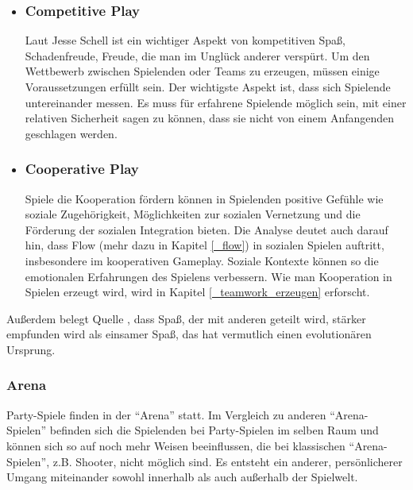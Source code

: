 \begin{itemize}
\item\subsubsection{Competitive Play}
Laut Jesse Schell ist ein wichtiger Aspekt von kompetitiven Spaß, Schadenfreude, Freude, die man im Unglück anderer verspürt\cite[S. 196]{_art_of_gamedesign}.
Um den Wettbewerb zwischen Spielenden oder Teams zu erzeugen, müssen einige Voraussetzungen erfüllt sein. Der wichtigste Aspekt ist, dass sich Spielende untereinander messen. Es muss für erfahrene Spielende möglich sein, mit einer relativen Sicherheit sagen zu können, dass sie nicht von einem Anfangenden geschlagen werden\Cite[S. 311]{_art_of_gamedesign}.

\item\subsubsection{Cooperative Play\label{_cooperative_play}}
Spiele die Kooperation fördern können in Spielenden positive Gefühle wie soziale Zugehörigkeit, Möglichkeiten zur sozialen Vernetzung und die Förderung der sozialen Integration bieten\cite{_putting_the_fun_factor_into_gaming}. Die Analyse deutet auch darauf hin, dass Flow (mehr dazu in Kapitel \ref{_flow}) in sozialen Spielen auftritt, insbesondere im kooperativen Gameplay\cite{_putting_the_fun_factor_into_gaming}. Soziale Kontexte können so die emotionalen Erfahrungen des Spielens verbessern. Wie man Kooperation in Spielen erzeugt wird, wird in Kapitel \ref{_teamwork_erzeugen} erforscht.
\end{itemize}

Außerdem belegt Quelle \cite{_fun_is_more_fun}, dass Spaß, der mit anderen geteilt wird, stärker empfunden wird als einsamer Spaß, das hat vermutlich einen evolutionären Ursprung.

\subsubsection{Arena}
Party-Spiele finden in der "`Arena"' statt\cite[S. 65]{_art_of_gamedesign}. Im Vergleich zu anderen "`Arena-Spielen"' befinden sich die Spielenden bei Party-Spielen im selben Raum und können sich so auf noch mehr Weisen beeinflussen, die bei klassischen "`Arena-Spielen"', z.B. Shooter, nicht möglich sind. Es entsteht ein anderer, persönlicherer Umgang miteinander sowohl innerhalb als auch außerhalb der Spielwelt.

